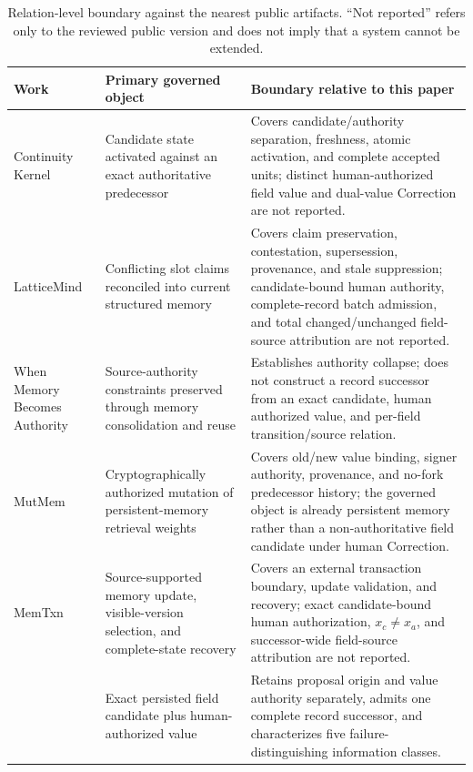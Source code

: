 \begin{table}[t]
\centering
\footnotesize
\caption{Relation-level boundary against the nearest public artifacts. ``Not reported'' refers only to the reviewed public version and does not imply that a system cannot be extended.}
\label{tab:nearest-neighbors}
\begin{tabularx}{\textwidth}{@{}>{\raggedright\arraybackslash}p{}>{\raggedright\arraybackslash}p{}>{\raggedright\arraybackslash}X@{}}
\toprule
Work & Primary governed object & Boundary relative to this paper \\
\midrule
Continuity Kernel & Candidate state activated against an exact authoritative predecessor & Covers candidate/authority separation, freshness, atomic activation, and complete accepted units; distinct human-authorized field value and dual-value Correction are not reported. \\
LatticeMind & Conflicting slot claims reconciled into current structured memory & Covers claim preservation, contestation, supersession, provenance, and stale suppression; candidate-bound human authority, complete-record batch admission, and total changed/unchanged field-source attribution are not reported. \\
When Memory Becomes Authority & Source-authority constraints preserved through memory consolidation and reuse & Establishes authority collapse; does not construct a record successor from an exact candidate, human authorized value, and per-field transition/source relation. \\
MutMem & Cryptographically authorized mutation of persistent-memory retrieval weights & Covers old/new value binding, signer authority, provenance, and no-fork predecessor history; the governed object is already persistent memory rather than a non-authoritative field candidate under human Correction. \\
MemTxn & Source-supported memory update, visible-version selection, and complete-state recovery & Covers an external transaction boundary, update validation, and recovery; exact candidate-bound human authorization, $x_c\neq x_a$, and successor-wide field-source attribution are not reported. \\
\system{} & Exact persisted field candidate plus human-authorized value & Retains proposal origin and value authority separately, admits one complete record successor, and characterizes five failure-distinguishing information classes. \\
\bottomrule
\end{tabularx}
\end{table}

